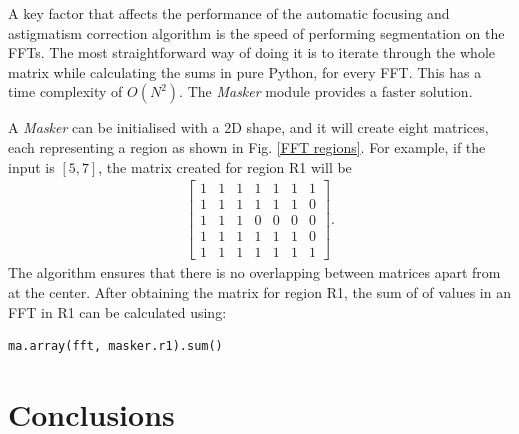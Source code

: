 \documentclass[12pt, conference]{IEEEtran}
\begin{document}
A key factor that affects the performance of the automatic focusing and astigmatism correction algorithm is the speed of performing segmentation on the FFTs. The most straightforward way of doing it is to iterate through the whole matrix while calculating the sums in pure Python, for every FFT. This has a time complexity of $O(N^2)$. The \textit{Masker} module provides a faster solution.

A \textit{Masker} can be initialised with a 2D shape, and it will create eight matrices, each representing a region as shown in Fig. \ref{FFT regions}. For example, if the input is $[5, 7]$, the matrix created for region R1 will be
\begin{align*}
\begin{bmatrix}
1 & 1 & 1 & 1 & 1 & 1 & 1\\
1 & 1 & 1 & 1 & 1 & 1 & 0\\
1 & 1 & 1 & 0 & 0 & 0 & 0\\
1 & 1 & 1 & 1 & 1 & 1 & 0\\
1 & 1 & 1 & 1 & 1 & 1 & 1
\end{bmatrix}.
\end{align*}
The algorithm ensures that there is no overlapping between matrices apart from at the center. After obtaining the matrix for region R1, the sum of of values in an FFT in R1 can be calculated using:
\begin{lstlisting}
ma.array(fft, masker.r1).sum()
\end{lstlisting}


\section{Conclusions}
\end{document}

